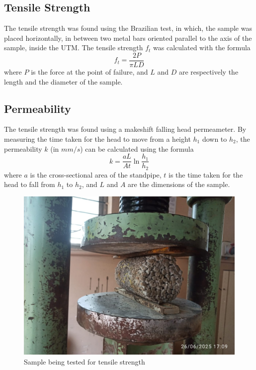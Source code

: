 \documentclass{ieeeaccess}
\begin{document}
\subsection{Tensile Strength}
The tensile strength was found using the Brazilian test, in which, the sample
was placed horizontally, in between two metal bars oriented parallel to the axis
of the sample, inside the UTM. The tensile strength $f_t$ was calculated with
the formula \[f_t = \frac{2P}{\pi LD}\] where $P$ is the force at the point of
failure, and $L$ and $D$ are respectively the length and the diameter of the
sample.

\subsection{Permeability}
The tensile strength was found using a makeshift falling head permeameter.
By measuring the time taken for the head to move from a height $h_1$ down to
$h_2$, the permeability $k$ (in $mm/s$) can be calculated using the formula 
\[k = \frac{aL}{At} \ln{\frac{h_1}{h_2}}\] where $a$ is the cross-sectional area
of the standpipe, $t$ is the time taken for the head to fall from $h_1$ to 
$h_2$, and $L$ and $A$ are the dimensions of the sample.

\begin{figure}[h]
    \caption{Sample being tested for tensile strength}
    \centering
    \includegraphics[scale=0.15]{tensile}
\end{figure}
\end{document}

